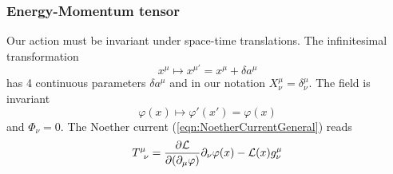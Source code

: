 \subsubsection{Energy-Momentum tensor}
Our action must be invariant under space-time translations.
The infinitesimal transformation
\begin{equation}
x^\mu \mapsto x^{\mu '} = x^\mu + \delta a^\mu
\end{equation}
has 4 continuous parameters $\delta a^\mu$ and in our notation
$X_\nu^\mu = \delta_\nu^\mu$. 
The field is invariant
\begin{equation}
\varphi (x) 
\mapsto
\varphi' (x') 
=
\varphi (x) 
\end{equation}
and $\Phi_{\nu} = 0$.
The Noether current (\ref{eqn:NoetherCurrentGeneral}) reads
\begin{eqnarray}
T^\mu_{\;\;\nu}
=
 \frac{\partial {\cal L}}{\partial (\partial_\mu \varphi)}
\partial_\nu \varphi(x) 
-
{\cal L}(x) 
g_\nu^\mu 
\label{eqn:NoetrherEnergyMomentum}
\end{eqnarray}

